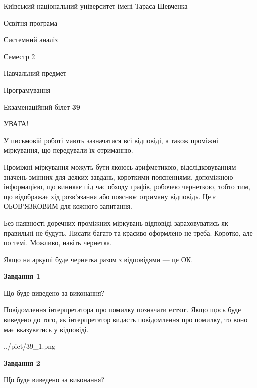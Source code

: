 \documentclass[12pt, ukrainian]{article}
\begin{document}
{{\begin {small}\par
{ \center  Київський національний університет імені Тараса Шевченка \par}
{\parbox {5 cm}{Освітня програма \hfill}{\parbox {7 cm}{Системний аналіз \hfill}}\parbox {6 cm}{\hfill Семестр 2}}\par
{\parbox {5 cm} {Навчальний предмет \hfill}\parbox {7 cm}{Програмування \hfill}\parbox {6cm}{\hfill}\par}\vspace{-7pt} \end{small}}{\center Екзаменаційний білет \No \textbf
{ 39 }\par}}
{
\begin {large}
УВАГА!

У письмовій роботі мають зазначатися всі відповіді, а також проміжні міркування, що передували їх отриманню.

Проміжні міркування можуть бути якоюсь арифметикою, відслідковуванням зна\-чень змінних для деяких завдань,
короткими поясненнями, допоміжною інформацією, що виникає під час обходу графів, робочею чернеткою,
тобто тим, що відображає хід розв’язання або пояснює отриману відповідь.
Це є ОБОВ’ЯЗКОВИМ для кожного запитання.

Без наявності доречних проміжних міркувань відповіді зараховуватись як правиль\-ні не будуть.
Писати багато та красиво оформлено не треба. Коротко, але по темі. Можли\-во, навіть чернетка.

Якщо на аркуші буде чернетка разом з відповідями --- це ОК.

\newpage

{\begin {center}\textbf{Завдання 1}\end {center}}\par
Що буде виведено за виконання?

Повідомлення інтерпретатора про помилку позначати \textbf{error}.
Якщо щось буде виведено до того, як інтерпретатор видасть повідомлення про помилку, 
то воно має вказуватись у відповіді. \par


\begin{center}
	{../pict/39_1.png}
\end{center}
\newpage

{\begin {center}\textbf{Завдання 2}\end {center}}\par
Що буде виведено за виконання?


\end{large}}
\end{document}
